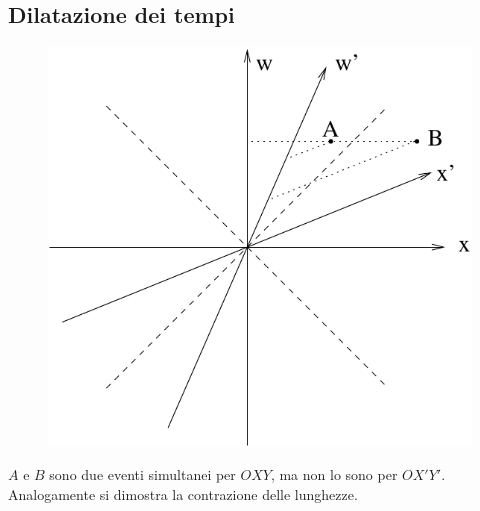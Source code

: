 \subsection{Dilatazione dei tempi}
\begin{figure}[htbp]
   \centering
   \includegraphics[scale=0.6]{immagini/fisica1/Mink3}
\end{figure}
$A$ e $B$ sono due eventi simultanei per $OXY$, ma non lo sono per $OX'Y'$. Analogamente si dimostra la contrazione delle lunghezze.

